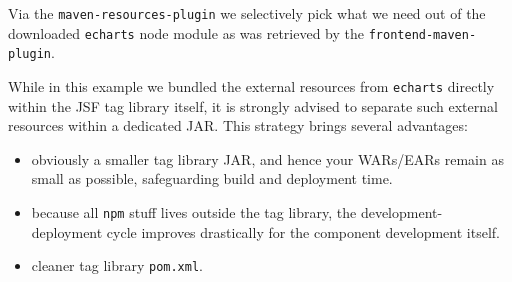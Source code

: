 Via the \texttt{maven-resources-plugin} we selectively pick what we need out of the downloaded \texttt{echarts} node module as was retrieved by the \texttt{frontend-maven-plugin}.

While in this example we bundled the external resources from \texttt{echarts} directly within the JSF tag library itself,
it is strongly advised to separate such external resources within a dedicated JAR.
This strategy brings several advantages:
\begin{itemize}
	\item obviously a smaller tag library JAR, and hence your WARs/EARs remain as small as possible, safeguarding build and deployment time.
	\item because all \texttt{npm} stuff lives outside the tag library, the development-deployment cycle improves drastically for the component development itself.
	\item cleaner tag library \texttt{pom.xml}.
\end{itemize}